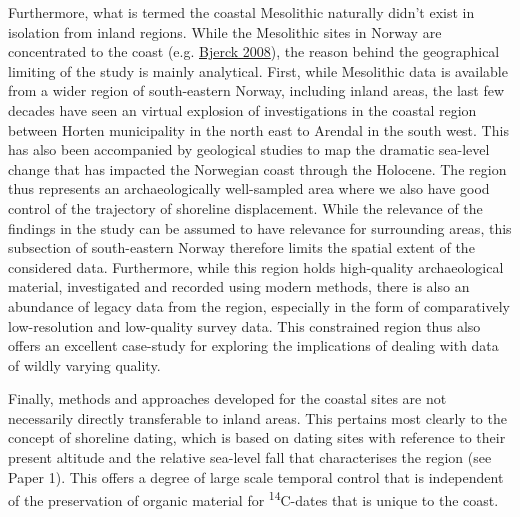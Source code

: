\documentclass[
  a4paper,
  oneside]{uiophdthesis}
\begin{document}
Furthermore, what is termed the coastal Mesolithic naturally didn't exist in isolation from inland regions. While the Mesolithic sites in Norway are concentrated to the coast (e.g. \protect\hyperlink{ref-bjerck2008}{Bjerck 2008}), the reason behind the geographical limiting of the study is mainly analytical. First, while Mesolithic data is available from a wider region of south-eastern Norway, including inland areas, the last few decades have seen an virtual explosion of investigations in the coastal region between Horten municipality in the north east to Arendal in the south west. This has also been accompanied by geological studies to map the dramatic sea-level change that has impacted the Norwegian coast through the Holocene. The region thus represents an archaeologically well-sampled area where we also have good control of the trajectory of shoreline displacement. While the relevance of the findings in the study can be assumed to have relevance for surrounding areas, this subsection of south-eastern Norway therefore limits the spatial extent of the considered data. Furthermore, while this region holds high-quality archaeological material, investigated and recorded using modern methods, there is also an abundance of legacy data from the region, especially in the form of comparatively low-resolution and low-quality survey data. This constrained region thus also offers an excellent case-study for exploring the implications of dealing with data of wildly varying quality.

Finally, methods and approaches developed for the coastal sites are not necessarily directly transferable to inland areas. This pertains most clearly to the concept of shoreline dating, which is based on dating sites with reference to their present altitude and the relative sea-level fall that characterises the region (see Paper 1). This offers a degree of large scale temporal control that is independent of the preservation of organic material for \textsuperscript{14}C-dates that is unique to the coast.
\end{document}
